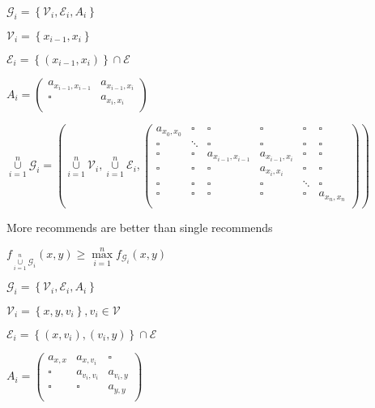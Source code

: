 \documentclass{article}
\begin{document}
\(\mathcal{G}_i=\left\{\mathcal{V}_i,\mathcal{E}_i,A_i\right\}\)

\(\mathcal{V}_i=\left\{x_{i-1},x_i\right\}\)

\(\mathcal{E}_i=\left\{\left(x_{i-1},x_i\right)\right\}\cap \mathcal{E}\)

\(A_i=\left(
\begin{array}{cc}
 a_{x_{i-1},x_{i-1}} & a_{x_{i-1},x_i} \\
 \square  & a_{x_i,x_i} \\
\end{array}
\right)\)

\(\underset{i=1}{\overset{n}{\cup }}\mathcal{G}_i=\left(\underset{i=1}{\overset{n}{\cup }}\mathcal{V}_i,\underset{i=1}{\overset{n}{\cup }}\mathcal{E}_i,\left(
\begin{array}{cccccc}
 a_{x_0,x_0} & \square  & \square  & \square  & \square  & \square  \\
 \square  & \ddots & \square  & \square  & \square  & \square  \\
 \square  & \square  & a_{x_{i-1},x_{i-1}} & a_{x_{i-1},x_i} & \square  & \square  \\
 \square  & \square  & \square  & a_{x_i,x_i} & \square  & \square  \\
 \square  & \square  & \square  & \square  & \ddots & \square  \\
 \square  & \square  & \square  & \square  & \square  & a_{x_n,x_n} \\
\end{array}
\right)\right)\)

More recommends are better than single recommends

\(f_{\underset{i=1}{\overset{n}{\cup }}\mathcal{G}_i}(x,y)\geq \underset{i=1}{\overset{n}{\max }}f_{\mathcal{G}_i}(x,y)\)

\(\mathcal{G}_i=\left\{\mathcal{V}_i,\mathcal{E}_i,A_i\right\}\)

\(\mathcal{V}_i=\left\{x,y,v_i\right\},v_i\in \mathcal{V}\)

\(\mathcal{E}_i=\left\{\left(x,v_i\right),\left(v_i,y\right)\right\}\cap \mathcal{E}\)

\(A_i=\left(
\begin{array}{ccc}
 a_{x,x} & a_{x,v_i} & \square  \\
 \square  & a_{v_i,v_i} & a_{v_i,y} \\
 \square  & \square  & a_{y,y} \\
\end{array}
\right)\)
\end{document}
